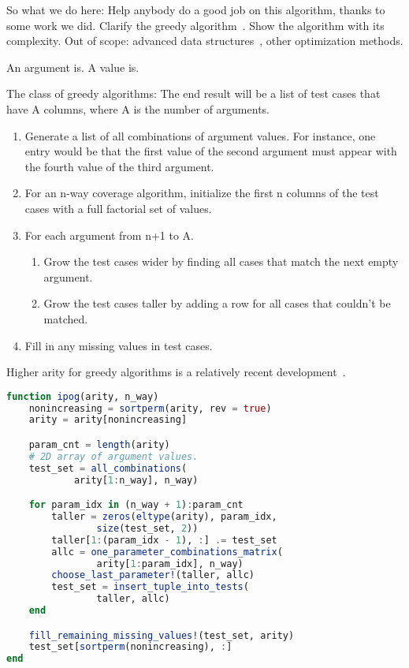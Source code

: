 \documentclass{juliacon}
\begin{document}
\vskip 6pt
So what we do here: Help anybody do a good job on this algorithm, thanks to some work we did.
Clarify the greedy algorithm~\cite{Lei2008-xt}. Show the algorithm with its complexity.
Out of scope: advanced data structures~\cite{Segall2011-jv}, other optimization methods.

\vskip 6pt
An argument is. A value is.

\vskip 6pt
The class of greedy algorithms:
The end result will be a list of test cases that have A columns, where A is the number of arguments.
\begin{enumerate}
   \item Generate a list of all combinations of argument values. For instance, one entry would be that the first value of the second argument must appear with the fourth value of the third argument.
   \item For an n-way coverage algorithm, initialize the first n columns of the test cases with a full factorial set of values.
   \item For each argument from n+1 to A.
   \begin{enumerate}
      \item Grow the test cases wider by finding all cases that match the next empty argument.
      \item Grow the test cases taller by adding a row for all cases that couldn't be matched.
   \end{enumerate}
   \item Fill in any missing values in test cases.
\end{enumerate}

Higher arity for greedy algorithms is a relatively recent development~\cite{Richard_Kuhn2008-ut}.

\vskip 6pt
\begin{lstlisting}[language=Julia]
function ipog(arity, n_way)
    nonincreasing = sortperm(arity, rev = true)
    arity = arity[nonincreasing]

    param_cnt = length(arity)
    # 2D array of argument values.
    test_set = all_combinations(
            arity[1:n_way], n_way)

    for param_idx in (n_way + 1):param_cnt
        taller = zeros(eltype(arity), param_idx,
                size(test_set, 2))
        taller[1:(param_idx - 1), :] .= test_set
        allc = one_parameter_combinations_matrix(
                arity[1:param_idx], n_way)
        choose_last_parameter!(taller, allc)
        test_set = insert_tuple_into_tests(
                taller, allc)
    end

    fill_remaining_missing_values!(test_set, arity)
    test_set[sortperm(nonincreasing), :]
end
\end{lstlisting}
\end{document}
